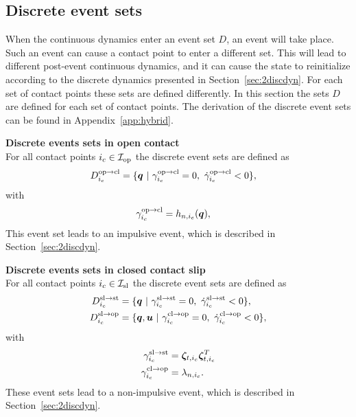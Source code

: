 \documentclass[../DC2017114Bouma.tex]{subfiles}
\begin{document}
\subsection{Discrete event sets}\label{sec:2event}
When the continuous dynamics enter an event set $D$, an event will take place. Such an event can cause a contact point to enter a different set. This will lead to different post-event continuous dynamics, and it can cause the state to reinitialize according to the discrete dynamics presented in Section~\ref{sec:2discdyn}. For each set of contact points these sets are defined differently. In this section the sets $D$ are defined for each set of contact points. The derivation of the discrete event sets can be found in Appendix~\ref{app:hybrid}.

\textbf{Discrete events sets in open contact}\\
For all contact points $i_c\in\mathcal{I}_{\text{op}}$ the discrete event sets are defined as
\begin{align}
D^{\text{op}\rightarrow\text{cl}}_{i_c} &= \{ \qb\ |\ \gamma^{\text{op}\rightarrow\text{cl}}_{i_c} = 0,\ \dot{\gamma}^{\text{op}\rightarrow\text{cl}}_{i_c} < 0 \},\label{eq:2Dopcl}
\end{align}
with
\begin{align}
\gamma^{\text{op}\rightarrow\text{cl}}_{i_c} &= h_{n,i_c}({\boldsymbol{q}}),
\end{align}
This event set leads to an impulsive event, which is described in Section~\ref{sec:2discdyn}.

\textbf{Discrete events sets in closed contact slip}\\
For all contact points $i_c\in\mathcal{I}_{\text{sl}}$ the discrete event sets are defined as
\begin{align}
D^{\text{sl}\rightarrow\text{st}}_{i_c} &= \{ \qb\ |\ \gamma^{\text{sl}\rightarrow\text{st}}_{i_c} = 0,\ \dot{\gamma}^{\text{sl}\rightarrow\text{st}}_{i_c} < 0\},\label{eq:2Dslst}\\
D^{\text{sl}\rightarrow\text{op}}_{i_c} &= \{ \qb,\ub\ |\ \gamma^{\text{cl}\rightarrow\text{op}}_{i_c} = 0,\ \dot{\gamma}^{\text{cl}\rightarrow\text{op}}_{i_c} < 0\},\label{eq:2Dslop}
\end{align}
with 
\begin{align}
\gamma^{\text{sl}\rightarrow\text{st}}_{i_c} &= \boldsymbol{\zeta}_{t,i_c}\boldsymbol{\zeta}_{t,i_c}^T\\
\gamma^{\text{cl}\rightarrow\text{op}}_{i_c} &= \lambda_{n,i_c}.
\end{align}
These event sets lead to a non-impulsive event, which is described in Section~\ref{sec:2discdyn}.
\end{document}
